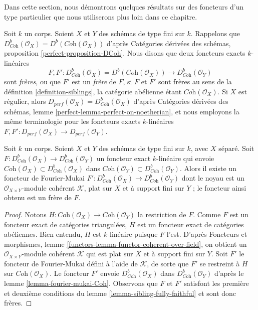 \noindent
Dans cette section, nous démontrons quelques résultats sur des foncteurs d'un type particulier
que nous utiliserons plus loin dans ce chapitre.

\begin{definition}
\label{definition-siblings-geometric}
Soit $k$ un corps. Soient $X$ et $Y$ des schémas de type fini sur $k$.
Rappelons que
$D^b_{\textit{Coh}}(\mathcal{O}_X) = D^b(\textit{Coh}(\mathcal{O}_X))$
d'après Catégories dérivées des schémas, proposition \ref{perfect-proposition-DCoh}.
Nous disons que deux foncteurs exacts $k$-linéaires
$$
F, F' :
D^b_{\textit{Coh}}(\mathcal{O}_X) = D^b(\textit{Coh}(\mathcal{O}_X))
\longrightarrow
D^b_{\textit{Coh}}(\mathcal{O}_Y)
$$
sont {\it frères}, ou que $F'$ est un {\it frère} de $F$, si $F$ et $F'$
sont frères au sens de la définition \ref{definition-siblings},
la catégorie abélienne étant $\textit{Coh}(\mathcal{O}_X)$.
Si $X$ est régulier, alors
$D_{perf}(\mathcal{O}_X) = D^b_{\textit{Coh}}(\mathcal{O}_X)$ d'après
Catégories dérivées des schémas, lemme \ref{perfect-lemma-perfect-on-noetherian},
et nous employons la même terminologie pour les foncteurs exacts $k$-linéaires
$F, F' : D_{perf}(\mathcal{O}_X) \to D_{perf}(\mathcal{O}_Y)$.
\end{definition}

\begin{lemma}
\label{lemma-exact-functor-preserving-Coh}
Soit $k$ un corps. Soient $X$ et $Y$ des schémas de type fini sur $k$, avec
$X$ séparé. Soit
$F : D^b_{\textit{Coh}}(\mathcal{O}_X) \to D^b_{\textit{Coh}}(\mathcal{O}_Y)$
un foncteur exact $k$-linéaire qui envoie
$\textit{Coh}(\mathcal{O}_X) \subset D^b_{\textit{Coh}}(\mathcal{O}_X)$
dans
$\textit{Coh}(\mathcal{O}_Y) \subset D^b_{\textit{Coh}}(\mathcal{O}_Y)$.
Alors il existe un foncteur de Fourier-Mukai
$F' : D^b_{\textit{Coh}}(\mathcal{O}_X) \to D^b_{\textit{Coh}}(\mathcal{O}_Y)$
dont le noyau est un $\mathcal{O}_{X \times Y}$-module cohérent $\mathcal{K}$,
plat sur $X$ et à support fini sur $Y$ ; le foncteur ainsi obtenu est un frère de $F$.
\end{lemma}

\begin{proof}
Notons $H : \textit{Coh}(\mathcal{O}_X) \to \textit{Coh}(\mathcal{O}_Y)$
la restriction de $F$. Comme $F$ est un foncteur exact de catégories
triangulées, $H$ est un foncteur exact de catégories abéliennes.
Bien entendu, $H$ est $k$-linéaire puisque $F$ l'est. D'après
Foncteurs et morphismes, lemme \ref{functors-lemma-functor-coherent-over-field},
on obtient un $\mathcal{O}_{X \times Y}$-module cohérent
$\mathcal{K}$ qui est plat sur $X$ et à support fini sur $Y$.
Soit $F'$ le foncteur de Fourier-Mukai défini à l'aide de $\mathcal{K}$,
de sorte que $F'$ se restreint à $H$ sur $ \textit{Coh}(\mathcal{O}_X)$.
Le foncteur $F'$ envoie $D^b_{\textit{Coh}}(\mathcal{O}_X)$
dans $D^b_{\textit{Coh}}(\mathcal{O}_Y)$ d'après le
lemme \ref{lemma-fourier-mukai-Coh}.
Observons que $F$ et $F'$ satisfont les première et deuxième
conditions du lemme \ref{lemma-sibling-fully-faithful} et sont donc frères.
\end{proof}


